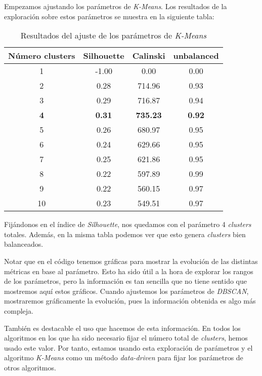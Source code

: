 \documentclass[11pt]{article}
\begin{document}
Empezamos ajustando los parámetros de \emph{K-Means}. Los resultados de la exploración sobre estos parámetros se muestra en la siguiente tabla:

\begin{table}[H]
\begin{center}
    \begin{tabular}{|c|c|c|c|}
        \hline
        Número clusters & Silhouette & Calinski & unbalanced \\
        \hline
        1 &  -1.00 &  0.00 &  0.00 \\
        2 &  0.28 &  714.96 &  0.93 \\
        3 &  0.29 &  716.87 &  0.94 \\
        \textbf{4} &  \textbf{0.31} &  \textbf{735.23} &  \textbf{0.92} \\
        5 &  0.26 &  680.97 &  0.95 \\
        6 &  0.24 &  629.66 &  0.95 \\
        7 &  0.25 &  621.86 &  0.95 \\
        8 &  0.22 &  597.89 &  0.99 \\
        9 &  0.22 &  560.15 &  0.97 \\
        10 &  0.23 &  549.51 &  0.97 \\
        \hline
    \end{tabular}
\end{center}
    \caption{Resultados del ajuste de los parámetros de \emph{K-Means}}
    \label{resultados_stcase01:tabla}
\end{table}

Fijándonos en el índice de \emph{Silhouette}, nos quedamos con el parámetro 4 \emph{clusters} totales. Además, en la misma tabla podemos ver que esto genera \emph{clusters} bien balanceados.

Notar que en el código tenemos gráficas para mostrar la evolución de las distintas métricas en base al parámetro. Esto ha sido útil a la hora de explorar los rangos de los parámetros, pero la información es tan sencilla que no tiene sentido que mostremos aquí estos gráficos. Cuando ajustemos los parámetros de \emph{DBSCAN}, mostraremos gráficamente la evolución, pues la información obtenida es algo más compleja.

También es destacable el uso que hacemos de esta información. En todos los algoritmos en los que ha sido necesario fijar el número total de \emph{clusters}, hemos usado este valor. Por tanto, estamos usando esta exploración de parámetros y el algoritmo \emph{K-Means} como un método \emph{data-driven} para fijar los parámetros de otros algoritmos.
\end{document}
